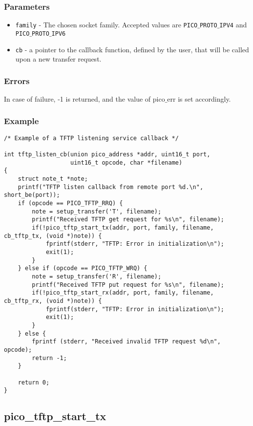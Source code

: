 \subsubsection*{Parameters}
\begin{itemize}[noitemsep]
\item \texttt{family} - The chosen socket family. Accepted values are \texttt{PICO$\_$PROTO$\_$IPV4} and \texttt{PICO$\_$PROTO$\_$IPV6}
\item \texttt{cb} - a pointer to the callback function, defined by the user, that will be called upon a new transfer request.
\end{itemize}

\subsubsection*{Errors}
In case of failure, -1 is returned, and the value of pico$\_$err
is set accordingly.

\subsubsection*{Example}

\begin{verbatim}
/* Example of a TFTP listening service callback */

int tftp_listen_cb(union pico_address *addr, uint16_t port,
                   uint16_t opcode, char *filename)
{
    struct note_t *note;
    printf("TFTP listen callback from remote port %d.\n", short_be(port));
    if (opcode == PICO_TFTP_RRQ) {
        note = setup_transfer('T', filename);
        printf("Received TFTP get request for %s\n", filename);
        if(!pico_tftp_start_tx(addr, port, family, filename, cb_tftp_tx, (void *)note)) {
            fprintf(stderr, "TFTP: Error in initialization\n");
            exit(1);
        }
    } else if (opcode == PICO_TFTP_WRQ) {
        note = setup_transfer('R', filename);
        printf("Received TFTP put request for %s\n", filename);
        if(!pico_tftp_start_rx(addr, port, family, filename, cb_tftp_rx, (void *)note)) {
            fprintf(stderr, "TFTP: Error in initialization\n");
            exit(1);
        }
    } else {
        fprintf (stderr, "Received invalid TFTP request %d\n", opcode);
        return -1;
    }

    return 0;
}

\end{verbatim}


\subsection{pico\_tftp\_start\_tx}

